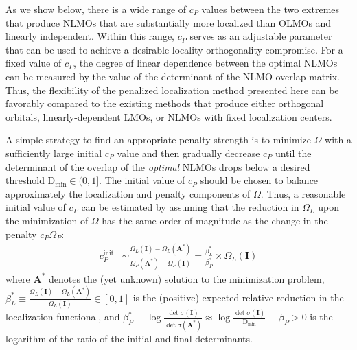 \documentclass[aps,prl,reprint,amsmath,amssymb]{revtex4-1}
\begin{document}
As we show below, there is a wide range of $c_P$ values between the two extremes that produce NLMOs that are substantially more localized than OLMOs and linearly independent.  
Within this range, $c_P$ serves as an adjustable parameter that can be used to achieve a desirable locality-orthogonality compromise. 
For a fixed value of $c_P$, the degree of linear dependence between the optimal NLMOs can be measured by the value of the determinant of the NLMO overlap matrix. 
Thus, the flexibility of the penalized localization method presented here can be favorably compared to the existing methods that produce either orthogonal orbitals, linearly-dependent LMOs, or NLMOs with fixed localization centers. 

A simple strategy to find an appropriate penalty strength is to minimize $\Omega$ with a sufficiently large initial $c_P$ value and then gradually decrease $c_P$ until the determinant of the overlap of the \emph{optimal} NLMOs drops below a desired threshold $\text{D}_{\text{min}} \in (0,1]$. 
The initial value of $c_P$ should be chosen to balance approximately the localization and penalty components of $\Omega$. 
Thus, a reasonable initial value of $c_P$ can be estimated by assuming that the reduction in $\Omega_L$ upon the minimization of $\Omega$ has the same order of magnitude as the change in the penalty $c_P \Omega_P$:
%
\begin{equation} \label{eq:cp-beta}
\begin{split} 
c_P^{\text{init}} & \sim \frac{ \Omega_{L}(\mathbf{I}) - \Omega_{L}(\mathbf{A}^{\ast}) }{ \Omega_{P}(\mathbf{A}^{\ast}) - \Omega_{P}(\mathbf{I}) } = \frac{ \beta_L^{\ast} }{ \beta_P^{\ast} } \times \Omega_{L}(\mathbf{I})
\end{split}
\end{equation}
%
where $\mathbf{A}^{\ast}$ denotes the (yet unknown) solution to the minimization problem, $\beta_L^{\ast} \equiv \frac{\Omega_L(\mathbf{I})- \Omega_L(\mathbf{A}^{\ast})}{\Omega_L(\mathbf{I})} \in [0,1]$ is the (positive) expected relative reduction in the localization functional, and $\beta_P^{\ast} \equiv \log \frac{\det \sigma(\mathbf{I})}{ \det \sigma(\mathbf{A}^{\ast}) } \approx \log \frac{\det \sigma(\mathbf{I})}{ \text{D}_{\text{min}} } \equiv \beta_P > 0$ is the logarithm of the ratio of the initial and final determinants. 
\end{document}

